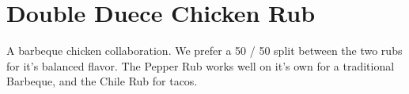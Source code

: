 \section[Double Duece]{Double Duece Chicken Rub}


\begin{recipestats}[
	servings=1~\pound,
	preptime=10~\minute,
	original=Kevin \& Mike,
]
\end{recipestats}


\begin{recipeabstract}
	A barbeque chicken collaboration.
	We prefer a 50 / 50 split between the two rubs for it's balanced flavor.
	The Pepper Rub works well on it's own for a traditional Barbeque, and the Chile Rub for tacos.
\end{recipeabstract}


\begin{ingredientcolumns}
	\begin{ingredientblock}
		\\
		\\
		\\
		\\
		\\
	\end{ingredientblock}
	\vfill\null
	\columnbreak

	\begin{ingredientblock}
		\\
		\\
		\\
		\\
		\\
		\\
		\\
	\end{ingredientblock}
\end{ingredientcolumns}


